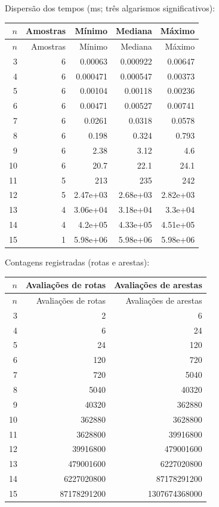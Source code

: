 \endgroup
\noindent Dispersão dos tempos (ms; três algarismos significativos):
\begin{longtable}{rrrrr}
\toprule
$n$ & Amostras & Mínimo & Mediana & Máximo \\
\midrule\endfirsthead
\toprule
$n$ & Amostras & Mínimo & Mediana & Máximo \\
\midrule\endhead
3 & 6 & 0.00063 & 0.000922 & 0.00647 \\
4 & 6 & 0.000471 & 0.000547 & 0.00373 \\
5 & 6 & 0.00104 & 0.00118 & 0.00236 \\
6 & 6 & 0.00471 & 0.00527 & 0.00741 \\
7 & 6 & 0.0261 & 0.0318 & 0.0578 \\
8 & 6 & 0.198 & 0.324 & 0.793 \\
9 & 6 & 2.38 & 3.12 & 4.6 \\
10 & 6 & 20.7 & 22.1 & 24.1 \\
11 & 5 & 213 & 235 & 242 \\
12 & 5 & 2.47e+03 & 2.68e+03 & 2.82e+03 \\
13 & 4 & 3.06e+04 & 3.18e+04 & 3.3e+04 \\
14 & 4 & 4.2e+05 & 4.33e+05 & 4.51e+05 \\
15 & 1 & 5.98e+06 & 5.98e+06 & 5.98e+06 \\
\bottomrule
\end{longtable}
\noindent Contagens registradas (rotas e arestas):
\begin{longtable}{rrr}
\toprule
$n$ & Avaliações de rotas & Avaliações de arestas \\
\midrule\endfirsthead
\toprule
$n$ & Avaliações de rotas & Avaliações de arestas \\
\midrule\endhead
3 & 2 & 6 \\
4 & 6 & 24 \\
5 & 24 & 120 \\
6 & 120 & 720 \\
7 & 720 & 5040 \\
8 & 5040 & 40320 \\
9 & 40320 & 362880 \\
10 & 362880 & 3628800 \\
11 & 3628800 & 39916800 \\
12 & 39916800 & 479001600 \\
13 & 479001600 & 6227020800 \\
14 & 6227020800 & 87178291200 \\
15 & 87178291200 & 1307674368000 \\
\bottomrule
\end{longtable}
